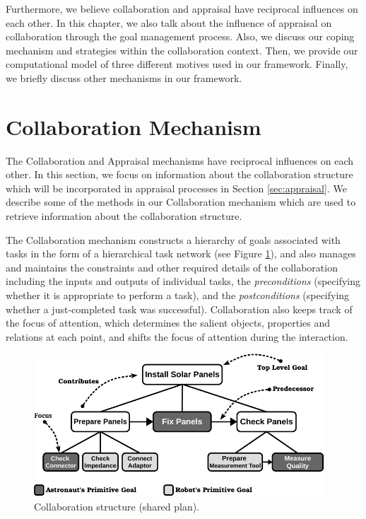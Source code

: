 \documentclass[12pt]{report}
\begin{document}
Furthermore, we believe collaboration and appraisal have reciprocal influences
on each other. In this chapter, we also talk about the influence of appraisal on
collaboration through the goal management process. Also, we discuss our coping
mechanism and strategies within the collaboration context. Then, we provide
our computational model of three different motives used in our framework.
Finally, we briefly discuss other mechanisms in our framework.

\vspace*{-5mm}
\section{Collaboration Mechanism}
\vspace*{-4mm}
The Collaboration and Appraisal mechanisms have reciprocal influences on each
other. In this section, we focus on information about the collaboration
structure which will be incorporated in appraisal processes in Section
\ref{sec:appraisal}. We describe some of the methods in our Collaboration
mechanism which are used to retrieve information about the collaboration
structure.

The Collaboration mechanism constructs a hierarchy of goals associated with
tasks in the form of a hierarchical task network (see Figure \ref{fig:cs}), and
also manages and maintains the constraints and other required details of the
collaboration including the inputs and outputs of individual tasks, the
\textit{preconditions} (specifying whether it is appropriate to perform a task),
and the \textit{postconditions} (specifying whether a just-completed task was
successful). Collaboration also keeps track of the focus of attention, which
determines the salient objects, properties and relations at each point, and
shifts the focus of attention during the interaction.

\begin{figure}[t]
  \centering
  \includegraphics[width=0.97\textwidth]{figure/collaborationStructure-small-croped.pdf}
  \caption{{\fontsize{10}{10}\selectfont Collaboration structure (shared
  plan).}}
  \label{fig:cs}
  \vspace*{-5mm}
\end{figure}
\end{document}
